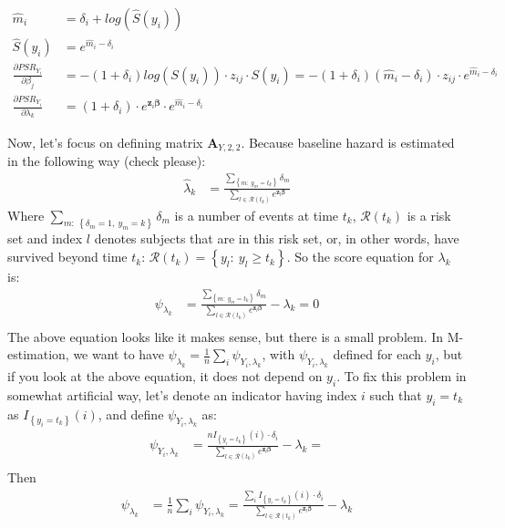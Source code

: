 \documentclass[]{article}
\begin{document}
  $$
  \begin{aligned}
    \hat{m}_i &= \delta_i + log\left(\hat{S}(y_i) \right) \\
    \hat{S}(y_i) &= e^{\hat{m}_i - \delta_i} \\
    \frac{\partial PSR_{Y_i}}{\partial \beta_j} &=  -(1+\delta_i)log\left(S(y_i)\right) \cdot  z_{ij}  \cdot  S(y_i)=  -(1+\delta_i)\left(\hat{m}_i - \delta_i \right) \cdot  z_{ij}  \cdot  e^{\hat{m}_i - \delta_i}\\
    \frac{\partial PSR_{Y_i}}{\partial \lambda_k} &=  (1+\delta_i)\cdot  e^{\pmb{z}_i\pmb{\beta}}   \cdot  e^{\hat{m}_i - \delta_i}
  \end{aligned}
  $$
  
Now, let's focus on defining matrix $\pmb{A}_{Y,2,2}$. Because baseline hazard is estimated in the following way (check please): 
  $$
  \begin{aligned}
    \hat{\lambda}_k &= \frac{\sum_{\left\{m:~y_m = t_k\right\}} \delta_m}{\sum_{l\in \mathcal{R}(t_k)} e^{\pmb{z}_l\pmb{\beta}}}
  \end{aligned}
  $$
Where $\sum_{m:~ \left\{\delta_m=1,~ y_m = k\right\}} \delta_m$ is a number of events at time $t_k$, $\mathcal{R}(t_k)$ is a risk set and index $l$ denotes subjects that are in this risk set, or, in other words, have survived beyond time $t_k$: $\mathcal{R}(t_k) = \left\{y_l: ~y_l \geq t_k \right\}$. 
So the score equation for $\lambda_k$ is:
  $$
  \begin{aligned}
    \psi_{{\lambda}_k} &= \frac{\sum_{\left\{m:~y_m = t_k\right\}} \delta_m}{\sum_{l\in \mathcal{R}(t_k)} e^{\pmb{z}_l\pmb{\beta}}}- {\lambda}_k = 0\\
  \end{aligned}
  $$
The above equation looks like it makes sense, but there is a small problem. In M-estimation, we want to have $\psi_{{\lambda}_k} = \frac{1}{n}\sum_i\psi_{Y_i,{\lambda}_k}$, with $\psi_{Y_i,{\lambda}_k}$ defined for each $y_i$, but if you look at the above equation, it does not depend on $y_i$. To fix this problem in somewhat artificial way, let's denote an indicator having index $i$ such that $y_i=t_k$ as $I_{\left\{y_i=t_k   \right\}}(i)$, and define $\psi_{Y_i,{\lambda}_k}$ as:\\
  $$
  \begin{aligned}
    \psi_{Y_i,{\lambda}_k} &= \frac{nI_{\left\{y_i=t_k   \right\}}(i)\cdot\delta_i}{\sum_{l\in \mathcal{R}(t_k)} e^{\pmb{z}_l\pmb{\beta}}}- {\lambda}_k =\\
  \end{aligned}
  $$
Then 
  $$
  \begin{aligned}
    \psi_{{\lambda}_k} &= \frac{1}{n}\sum_i\psi_{Y_i,{\lambda}_k} = \frac{\sum_i I_{\left\{y_i=t_k   \right\}}(i)\cdot\delta_i}{\sum_{l\in \mathcal{R}(t_k)} e^{\pmb{z}_l\pmb{\beta}}}- {\lambda}_k\\
  \end{aligned}
  $$
\end{document}
